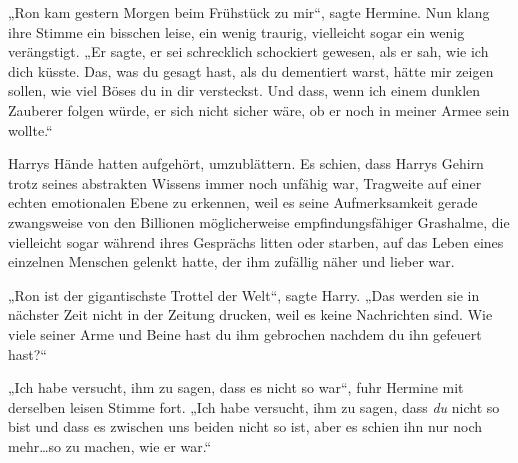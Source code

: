 „Ron kam gestern Morgen beim Frühstück zu mir“, sagte Hermine. Nun klang ihre Stimme ein bisschen leise, ein wenig traurig, vielleicht sogar ein wenig verängstigt. „Er sagte, er sei schrecklich schockiert gewesen, als er sah, wie ich dich küsste. Das, was du gesagt hast, als du dementiert warst, hätte mir zeigen sollen, wie viel Böses du in dir versteckst. Und dass, wenn ich einem dunklen Zauberer folgen würde, er sich nicht sicher wäre, ob er noch in meiner Armee sein wollte.“

Harrys Hände hatten aufgehört, umzublättern. Es schien, dass Harrys Gehirn trotz seines abstrakten Wissens immer noch unfähig war, Tragweite auf einer echten emotionalen Ebene zu erkennen, weil es seine Aufmerksamkeit gerade zwangsweise von den Billionen möglicherweise empfindungsfähiger Grashalme, die vielleicht sogar während ihres Gesprächs litten oder starben, auf das Leben eines einzelnen Menschen gelenkt hatte, der ihm zufällig näher und lieber war.

„Ron ist der gigantischste Trottel der Welt“, sagte Harry. „Das werden sie in nächster Zeit nicht in der Zeitung drucken, weil es keine Nachrichten sind. Wie viele seiner Arme und Beine hast du ihm gebrochen nachdem du ihn gefeuert hast?“

„Ich habe versucht, ihm zu sagen, dass es nicht so war“, fuhr Hermine mit derselben leisen Stimme fort. „Ich habe versucht, ihm zu sagen, dass \emph{du} nicht so bist und dass es zwischen uns beiden nicht so ist, aber es schien ihn nur noch mehr…so zu machen, wie er war.“

